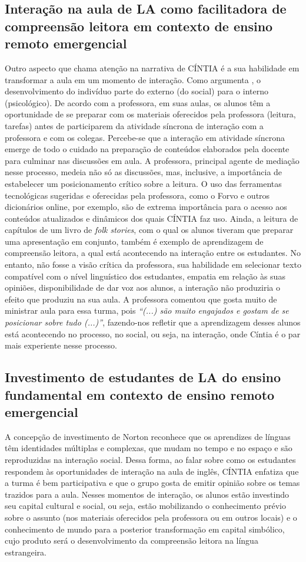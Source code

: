 \documentclass{textolivre}
\begin{document}
\subsection{Interação na aula de LA como facilitadora de compreensão leitora em contexto de ensino remoto emergencial}
Outro aspecto que chama atenção na narrativa de CÍNTIA é a sua habilidade em transformar a aula em um momento de interação. Como argumenta \textcite{vygotsky1978}, o desenvolvimento do indivíduo parte do externo (do social) para o interno (psicológico). De acordo com a professora, em suas aulas, os alunos têm a oportunidade de se preparar com os materiais oferecidos pela professora (leitura, tarefas) antes de participarem da atividade síncrona de interação com a professora e com os colegas. Percebe-se que a interação em atividade síncrona emerge de todo o cuidado na preparação de conteúdos elaborados pela docente para culminar nas discussões em aula. A professora, principal agente de mediação nesse processo, medeia não só as discussões, mas, inclusive, a importância de estabelecer um posicionamento crítico sobre a leitura. O uso das ferramentas tecnológicas sugeridas e oferecidas pela professora, como o Forvo e outros dicionários online, por exemplo, são de extrema importância para o acesso aos conteúdos atualizados e dinâmicos dos quais CÍNTIA faz uso. Ainda, a leitura de capítulos de um livro de \emph{folk stories}, com o qual os alunos tiveram que preparar uma apresentação em conjunto, também é exemplo de aprendizagem de compreensão leitora, a qual está acontecendo na interação entre os estudantes. No entanto, não fosse a visão crítica da professora, sua habilidade em selecionar texto compatível com o nível linguístico dos estudantes, empatia em relação às suas opiniões, disponibilidade de dar voz aos alunos, a interação não produziria o efeito que produziu na sua aula. A professora comentou que gosta muito de ministrar aula para essa turma, pois \emph{“(...) são muito engajados e gostam de se posicionar sobre tudo (...)”}, fazendo-nos refletir que a aprendizagem desses alunos está acontecendo no processo, no social, ou seja, na interação, onde Cíntia é o par mais experiente nesse processo.  

\subsection{Investimento de estudantes de LA do ensino fundamental em contexto de ensino remoto emergencial}
A concepção de investimento de Norton reconhece que os aprendizes de línguas têm identidades múltiplas e complexas, que mudam no tempo e no espaço e são reproduzidas na interação social. Dessa forma, ao falar sobre como os estudantes respondem às oportunidades de interação na aula de inglês, CÍNTIA enfatiza que a turma é bem participativa e que o grupo gosta de emitir opinião sobre os temas trazidos para a aula. Nesses momentos de interação, os alunos estão investindo seu capital cultural e social, ou seja, estão mobilizando o conhecimento prévio sobre o assunto (nos materiais oferecidos pela professora ou em outros locais) e o conhecimento de mundo para a posterior transformação em capital simbólico, cujo produto será o desenvolvimento da compreensão leitora na língua estrangeira.
\end{document}
